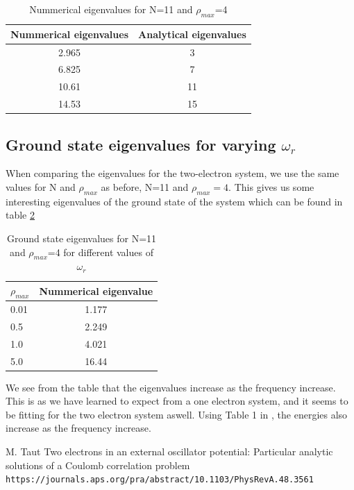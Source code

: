 \documentclass{article}
\begin{document}
\begin{table}[H]
    \centering
    \begin{tabular}{|c|c|}
    \hline
     Nummerical eigenvalues & Analytical eigenvalues\\
     \hline
      2.965  &  3\\
      6.825  &  7\\
      10.61  &  11\\
      14.53  &  15\\
     \hline
    \end{tabular}
    \caption{Nummerical eigenvalues for N=11 and $\rho_{max}$=4}
    \label{tabelur1}
\end{table}

\subsection{Ground state eigenvalues for varying $\omega_r$}

When comparing the eigenvalues for the two-electron system, we use the same values for N and $\rho_{max}$ as before, N=11 and $\rho_{max}=4$. This gives us some interesting eigenvalues of the ground state of the system which can be found in table \ref{tabelur2}

\begin{table}[H]
    \centering
    \begin{tabular}{|l|c|}
    \hline
    $\rho_{max}$ & Nummerical eigenvalue \\
    \hline
    0.01 & 1.177  \\
    0.5  & 2.249  \\
    1.0 & 4.021  \\
    5.0 &  16.44  \\
     \hline
    \end{tabular}
    \caption{Ground state eigenvalues for N=11 and $\rho_{max}$=4 for different values of $\omega_r$}
    \label{tabelur2}
\end{table}

We see from the table that the eigenvalues increase as the frequency increase. This is as we have learned to expect from a one electron system, and it seems to be fitting for the two electron system aswell. Using Table 1 in \cite{M.Tant}, the energies also increase as the frequency increase.

\begin{thebibliography}{}
M. Taut Two electrons in an external oscillator potential: Particular analytic solutions of a Coulomb correlation problem
\\\texttt{https://journals.aps.org/pra/abstract/10.1103/PhysRevA.48.3561}

\end{thebibliography}
\end{document}
